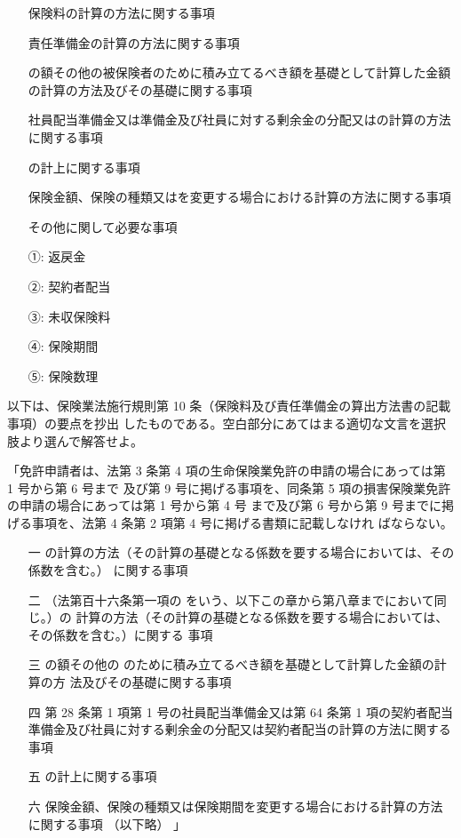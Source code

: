 \documentclass[report,gutter=10mm,fore-edge=10mm,uplatex,dvipdfmx]{jlreq}
\begin{document}
\begin{itemize}
\item[ ] 保険料の計算の方法に関する事項
\item[ ] 責任準備金の計算の方法に関する事項
\item[ ] の額その他の被保険者のために積み立てるべき額を基礎として計算した金額の計算の方法及びその基礎に関する事項
\item[ ] 社員配当準備金又は準備金及び社員に対する剰余金の分配又はの計算の方法に関する事項
\item[ ] の計上に関する事項
\item[ ] 保険金額、保険の種類又はを変更する場合における計算の方法に関する事項
\item[ ] その他に関して必要な事項
\end{itemize}

\answer{}
\begin{itemize}
\item[①:]  返戻金
\item[②:]  契約者配当
\item[③:]  未収保険料
\item[④:]  保険期間
\item[⑤:]  保険数理
\end{itemize}

以下は、保険業法施行規則第 10 条（保険料及び責任準備金の算出方法書の記載事項）の要点を抄出
したものである。空白部分にあてはまる適切な文言を選択肢より選んで解答せよ。

「免許申請者は、法第 3 条第 4 項の生命保険業免許の申請の場合にあっては第 1 号から第 6 号まで
及び第 9 号に掲げる事項を、同条第 5 項の損害保険業免許の申請の場合にあっては第 1 号から第 4 号
まで及び第 6 号から第 9 号までに掲げる事項を、法第 4 条第 2 項第 4 号に掲げる書類に記載しなけれ
ばならない。

\begin{itemize}
\item[ 一]   の計算の方法（その計算の基礎となる係数を要する場合においては、その係数を含む。） に関する事項
\item[ 二]   （法第百十六条第一項の  をいう、以下この章から第八章までにおいて同じ。）の 計算の方法（その計算の基礎となる係数を要する場合においては、その係数を含む。）に関する 事項
\item[ 三]   の額その他の  のために積み立てるべき額を基礎として計算した金額の計算の方 法及びその基礎に関する事項
\item[ 四]  第 28 条第 1 項第 1 号の社員配当準備金又は第 64 条第 1 項の契約者配当準備金及び社員に対する剰余金の分配又は契約者配当の計算の方法に関する事項
\item[ 五]   の計上に関する事項
\item[ 六]  保険金額、保険の種類又は保険期間を変更する場合における計算の方法に関する事項
 （以下略） 」
\end{itemize}
\end{document}
